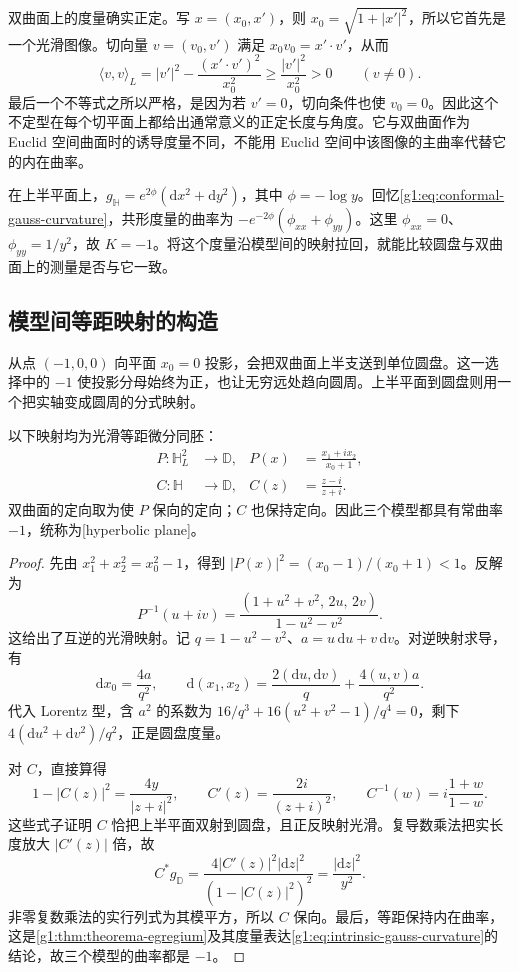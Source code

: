 双曲面上的度量确实正定。写 \(x=(x_0,x')\)，则 \(x_0=\sqrt{1+|x'|^2}\)，所以它首先是一个光滑图像。切向量 \(v=(v_0,v')\) 满足 \(x_0v_0=x'\cdot v'\)，从而
\[
	\langle v,v\rangle_L=|v'|^2-\frac{(x'\cdot v')^2}{x_0^2}
	\geq\frac{|v'|^2}{x_0^2}>0\qquad(v\ne0).
\]
最后一个不等式之所以严格，是因为若 \(v'=0\)，切向条件也使 \(v_0=0\)。因此这个不定型在每个切平面上都给出通常意义的正定长度与角度。它与双曲面作为 Euclid 空间曲面时的诱导度量不同，不能用 Euclid 空间中该图像的主曲率代替它的内在曲率。

\ProseParagraphBreak

在上半平面上，\(g_{\mathbb H}=e^{2\phi}(\mathrm{d}x^2+\mathrm{d}y^2)\)，其中 \(\phi=-\log y\)。回忆\eqref{g1:eq:conformal-gauss-curvature}，共形度量的曲率为 \(-e^{-2\phi}(\phi_{xx}+\phi_{yy})\)。这里 \(\phi_{xx}=0\)、\(\phi_{yy}=1/y^2\)，故 \(K=-1\)。将这个度量沿模型间的映射拉回，就能比较圆盘与双曲面上的测量是否与它一致。

\subsection{模型间等距映射的构造}
\label{g1:subsec:1001:02}

从点 \((-1,0,0)\) 向平面 \(x_0=0\) 投影，会把双曲面上半支送到单位圆盘。这一选择中的 \(-1\) 使投影分母始终为正，也让无穷远处趋向圆周。上半平面到圆盘则用一个把实轴变成圆周的分式映射。

\begin{proposition}
	\label{g1:prop:hyperbolic-model-isometries}
	以下映射均为光滑等距微分同胚：
	\begin{align*}
		P:\mathbb H_L^2&\longrightarrow\mathbb D,&
		P(x)&=\frac{x_1+ix_2}{x_0+1},\\
		C:\mathbb H&\longrightarrow\mathbb D,&
		C(z)&=\frac{z-i}{z+i}.
	\end{align*}
	双曲面的定向取为使 \(P\) 保向的定向；\(C\) 也保持定向。因此三个模型都具有常曲率 \(-1\)，统称为[hyperbolic plane]。
\end{proposition}
\begin{proof}
	先由 \(x_1^2+x_2^2=x_0^2-1\)，得到 \(|P(x)|^2=(x_0-1)/(x_0+1)<1\)。反解为
	\[
		P^{-1}(u+iv)=\frac{(1+u^2+v^2,\,2u,\,2v)}{1-u^2-v^2}.
	\]
	这给出了互逆的光滑映射。记 \(q=1-u^2-v^2\)、\(a=u\,\mathrm{d}u+v\,\mathrm{d}v\)。对逆映射求导，有
	\[
		\mathrm{d}x_0=\frac{4a}{q^2},\qquad
		\mathrm{d}(x_1,x_2)=\frac{2(\mathrm{d}u,\mathrm{d}v)}q+\frac{4(u,v)a}{q^2}.
	\]
	代入 Lorentz 型，含 \(a^2\) 的系数为 \(16/q^3+16(u^2+v^2-1)/q^4=0\)，剩下 \(4(\mathrm{d}u^2+\mathrm{d}v^2)/q^2\)，正是圆盘度量。

	对 \(C\)，直接算得
	\[
		1-|C(z)|^2=\frac{4y}{|z+i|^2},\qquad
		C'(z)=\frac{2i}{(z+i)^2},\qquad C^{-1}(w)=i\frac{1+w}{1-w}.
	\]
	这些式子证明 \(C\) 恰把上半平面双射到圆盘，且正反映射光滑。复导数乘法把实长度放大 \(|C'(z)|\) 倍，故
	\[
		C^*g_{\mathbb D}
		=\frac{4|C'(z)|^2|\mathrm{d}z|^2}{(1-|C(z)|^2)^2}
		=\frac{|\mathrm{d}z|^2}{y^2}.
	\]
	非零复数乘法的实行列式为其模平方，所以 \(C\) 保向。最后，等距保持内在曲率，这是\cref{g1:thm:theorema-egregium}及其度量表达\eqref{g1:eq:intrinsic-gauss-curvature}的结论，故三个模型的曲率都是 \(-1\)。
\end{proof}

